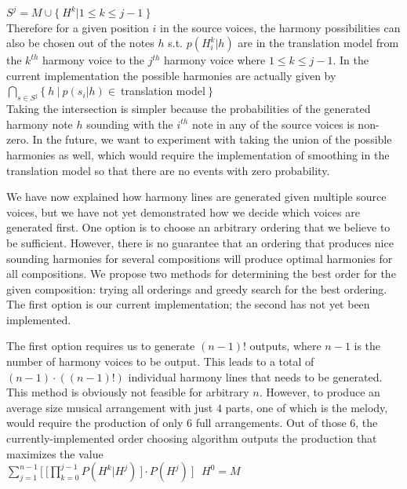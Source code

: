 \documentclass{sig-alternate}
\begin{document}
$S^{j} = {M} \cup \{\ H^k | 1 \leq k \leq j- 1\ \} $\\


Therefore for a given position $i$ in the source voices, the harmony possibilities can also be chosen out of the notes $h$ s.t. $p(H^{k}_{i} | h)$ are in the translation model from the $k^{th}$ harmony voice to the $j^{th}$ harmony voice where $1 \leq k \leq j - 1$. In the current implementation the possible harmonies are actually given by \\

$\bigcap_{s \in S^{j}} \{\ h\ |\ p(s_{i} | h) \in\ $translation model$\ \}$\\

Taking the intersection is simpler because the probabilities of the generated harmony note $h$ sounding with the $i^{th}$ note in any of the source voices is non-zero. In the future, we want to experiment with taking the union of the possible harmonies as well, which would require the implementation of smoothing in the translation model so that there are no events with zero probability. 

We have now explained how harmony lines are generated given multiple source voices, but we have not yet demonstrated how we decide which voices are generated first. One option is to choose an arbitrary ordering that we believe to be sufficient. However, there is no guarantee that an ordering that produces nice sounding harmonies for several compositions will produce optimal harmonies for all compositions. We propose two methods for determining the best order for the given composition: trying all orderings and greedy search for the best ordering. The first option is our current implementation; the second has not yet been implemented.

The first option requires us to generate $(n - 1)!$ outputs, where $n - 1$ is the number of harmony voices to be output. This leads to a total of $(n -1)\cdot((n-1)!)$ individual harmony lines that needs to be generated. This method is obviously not feasible for arbitrary $n$. However, to produce an average size musical arrangement with just $4$ parts, one of which is the melody, would require the production of only $6$ full arrangements. Out of those $6$, the currently-implemented order choosing algorithm outputs the production that maximizes the value\\

$\sum_{j = 1}^{n - 1} \lbrack\ \lbrack\prod_{k = 0}^{j - 1} P(H^{k} | H^{j})\ \rbrack \cdot P(H^{j})\ \rbrack\ \ \ H^{0} = M$\\
\end{document}
